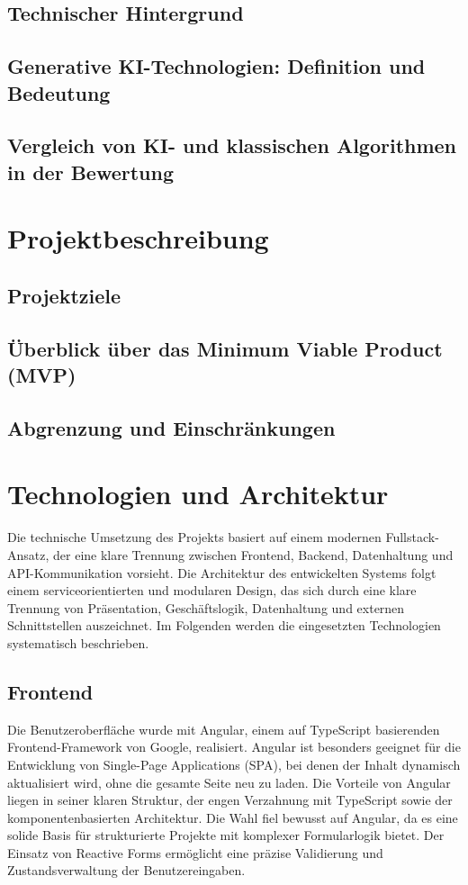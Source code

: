 \documentclass[a4paper,12pt]{article}
\begin{document}
\subsection{Technischer Hintergrund}
\subsection{Generative KI-Technologien: Definition und Bedeutung}
\subsection{Vergleich von KI- und klassischen Algorithmen in der Bewertung}

\newpage

\section{Projektbeschreibung}
\subsection{Projektziele}
\subsection{Überblick über das Minimum Viable Product (MVP)}
\subsection{Abgrenzung und Einschränkungen}

\newpage


\section{Technologien und Architektur}
Die technische Umsetzung des Projekts basiert auf einem modernen Fullstack-Ansatz, der eine klare Trennung zwischen Frontend, Backend, Datenhaltung und API-Kommunikation vorsieht. Die Architektur des entwickelten Systems folgt einem serviceorientierten und modularen Design, das sich durch eine klare Trennung von Präsentation, Geschäftslogik, Datenhaltung und externen Schnittstellen auszeichnet. Im Folgenden werden die eingesetzten Technologien systematisch beschrieben.
\subsection{Frontend}
Die Benutzeroberfläche wurde mit Angular, einem auf TypeScript basierenden Frontend-Framework von Google, realisiert. Angular ist besonders geeignet für die Entwicklung von Single-Page Applications (SPA), bei denen der Inhalt dynamisch aktualisiert wird, ohne die gesamte Seite neu zu laden. Die Vorteile von Angular liegen in seiner klaren Struktur, der engen Verzahnung mit TypeScript sowie der komponentenbasierten Architektur. Die Wahl fiel bewusst auf Angular, da es eine solide Basis für strukturierte Projekte mit komplexer Formularlogik bietet. Der Einsatz von Reactive Forms ermöglicht eine präzise Validierung und Zustandsverwaltung der Benutzereingaben.
\end{document}
